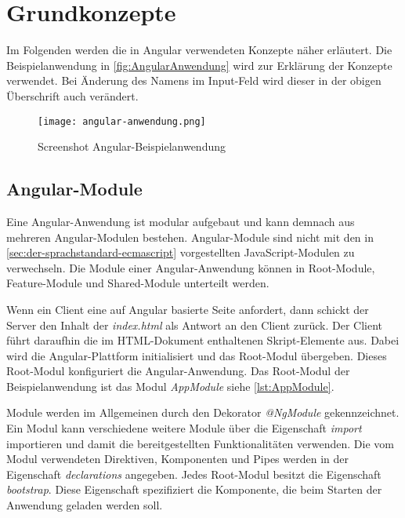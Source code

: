 \section{Grundkonzepte}



Im Folgenden werden die in Angular verwendeten Konzepte näher erläutert. Die Beispielanwendung in \autoref{fig:AngularAnwendung} wird zur Erklärung der Konzepte verwendet. Bei Änderung des Namens im Input-Feld wird dieser in der obigen Überschrift auch verändert.

\begin{figure}
	\centering
	\texttt{[image: angular-anwendung.png]}
	\caption{Screenshot Angular-Beispielanwendung} 
	\label{fig:AngularAnwendung}
\end{figure}



\subsection{Angular-Module}

Eine Angular-Anwendung ist modular aufgebaut und kann demnach aus mehreren Angular-Modulen bestehen. Angular-Module sind nicht mit den in \autoref{sec:der-sprachstandard-ecmascript} vorgestellten JavaScript-Modulen zu verwechseln. \autocites[vgl.][103\psqq]{Steyer.2017}[vgl.][301\psqq]{Woiwode.2018} Die Module einer Angular-Anwendung können in Root-Module, Feature-Module und Shared-Module unterteilt werden. 

Wenn ein Client eine auf Angular basierte Seite anfordert, dann schickt der Server den Inhalt der \textit{index.html} als Antwort an den Client zurück. Der Client führt daraufhin die im HTML-Dokument enthaltenen Skript-Elemente aus. Dabei wird die Angular-Plattform initialisiert und das Root-Modul übergeben. Dieses Root-Modul konfiguriert die Angular-Anwendung.\autocites[vgl.][60]{Steyer.2017}[vgl.][226\psqq]{Freeman.2018}  Das Root-Modul der Beispielanwendung ist das Modul \textit{AppModule} siehe \autoref{lst:AppModule}. 

Module werden im Allgemeinen durch den Dekorator \textit{@NgModule} gekennzeichnet. Ein Modul kann verschiedene weitere Module über die Eigenschaft \textit{import} importieren und damit die bereitgestellten Funktionalitäten verwenden. Die vom Modul verwendeten Direktiven, Komponenten und Pipes werden in der Eigenschaft \textit{declarations} angegeben. Jedes Root-Modul besitzt die Eigenschaft \textit{bootstrap}. Diese Eigenschaft spezifiziert die Komponente, die beim Starten der Anwendung geladen werden soll. 

